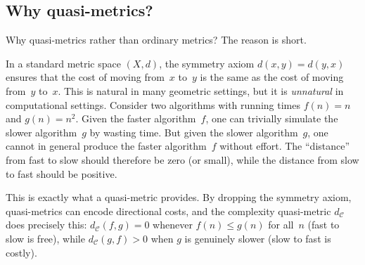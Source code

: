 \documentclass[11pt,a4paper]{article}
\theoremstyle{plain}
\theoremstyle{definition}
\newcommand{\C}{\mathcal{C}}
\begin{document}
\subsection{Why quasi-metrics?}

Why quasi-metrics rather than ordinary metrics?  The reason is short.

In a standard metric space $(X,d)$, the symmetry axiom $d(x,y)=d(y,x)$
ensures that the cost of moving from~$x$ to~$y$ is the same as the
cost of moving from~$y$ to~$x$.  This is natural in many geometric
settings, but it is \emph{unnatural} in computational settings.  Consider
two algorithms with running times $f(n)=n$ and $g(n)=n^2$.  Given
the faster algorithm~$f$, one can trivially simulate the slower
algorithm~$g$ by wasting time.  But given the slower algorithm~$g$,
one cannot in general produce the faster algorithm~$f$ without effort.
The ``distance'' from fast to slow should therefore be zero (or small),
while the distance from slow to fast should be positive.

This is exactly what a quasi-metric provides.  By dropping the symmetry
axiom, quasi-metrics can encode directional costs, and the complexity
quasi-metric $d_\C$ does precisely this: $d_\C(f,g)=0$ whenever
$f(n)\le g(n)$ for all~$n$ (fast to slow is free), while
$d_\C(g,f)>0$ when $g$ is genuinely slower (slow to fast is costly).
\end{document}
